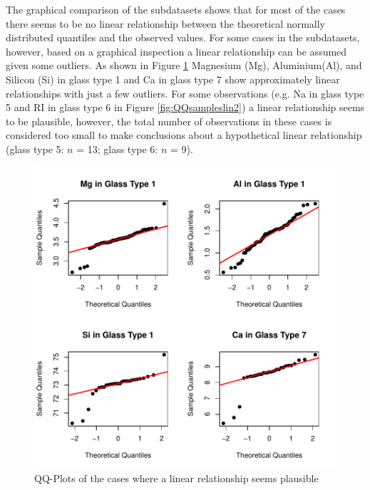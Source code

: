 \documentclass[a4paper, 12pt, titlepage, headsepline, listof = totoc, bibliography = totoc, numbers = noenddot]{scrartcl}
\begin{document}
The graphical comparison of the subdatasets shows that for most of the cases there seems to be no linear relationship between the theoretical normally distributed quantiles and the observed values. For some cases in the subdatasets, however, based on a graphical inspection a linear relationship can be assumed given some outliers. As shown in Figure \ref{fig:QQsampleslin1} Magnesium (Mg), Aluminium(Al), and Silicon (Si) in glass type 1 and Ca in glass type 7 show approximately linear relationships with just a few outliers. For some observations (e.g. Na in glass type 5 and RI in glass type 6 in Figure \ref{fig:QQsampleslin2}) a linear relationship seems to be plausible, however, the total number of observations in these cases is considered too small to make conclusions about a hypothetical linear relationship (glass type 5: $n$ = 13; glass type 6: $n$ = 9).

\begin{figure}[h!]
\centering
\includegraphics[width=\textwidth]{report-QQsampleslin1}
\caption{QQ-Plots of the cases where a linear relationship seems plausible}
\label{fig:QQsampleslin1}
\end{figure}

\end{document}
